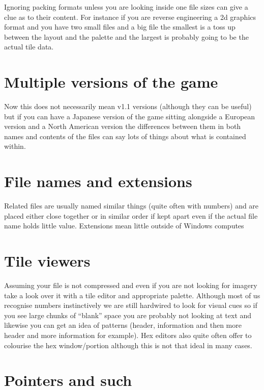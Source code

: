 \documentclass[
]{book}
\begin{document}
Ignoring packing formats unless you are looking inside one file sizes can give a clue as to their content. For instance if you are reverse engineering a 2d graphics format and you have two small files and a big file the smallest is a toss up between the layout and the palette and the largest is probably going to be the actual tile data.

\hypertarget{multiple-versions-of-the-game}{%
\section{Multiple versions of the game}\label{multiple-versions-of-the-game}}

Now this does not necessarily mean v1.1 versions (although they can be useful) but if you can have a Japanese version of the game sitting alongside a European version and a North American version the differences between them in both names and contents of the files can say lots of things about what is contained within.

\hypertarget{file-names-and-extensions}{%
\section{File names and extensions}\label{file-names-and-extensions}}

Related files are usually named similar things (quite often with numbers) and are placed either close together or in similar order if kept apart even if the actual file name holds little value. Extensions mean little outside of Windows computes

\hypertarget{tile-viewers}{%
\section{Tile viewers}\label{tile-viewers}}

Assuming your file is not compressed and even if you are not looking for imagery take a look over it with a tile editor and appropriate palette. Although most of us recognise numbers instinctively we are still hardwired to look for visual cues so if you see large chunks of ``blank'' space you are probably not looking at text and likewise you can get an idea of patterns (header, information and then more header and more information for example). Hex editors also quite often offer to colourise the hex window/portion although this is not that ideal in many cases.

\hypertarget{pointers-and-such}{%
\section{Pointers and such}\label{pointers-and-such}}
\end{document}
